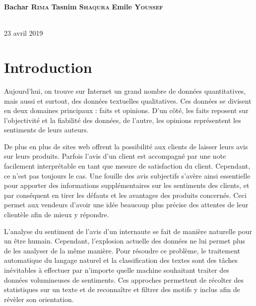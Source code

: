 \documentclass[12pt,a4paper]{report}
\theoremstyle{definition}
\begin{document}
\begin{titlepage}
\begin{minipage}{0.4\textwidth}
\centering \Large
\textbf{Bachar \textsc{Rima}} %
\textbf{Tasnim \textsc{Shaqura}} %
\textbf{Emile \textsc{Youssef}} %
\end{minipage} \\[0.8cm]

{\large 23 avril 2019}\\[1cm]
\hspace{\fill}
\vfill %
\end{titlepage}

\tableofcontents
\cleardoublepage

\setcounter{page}{1}
\chapter{Introduction}
Aujourd'hui, on trouve sur Internet un grand nombre de données quantitatives, mais aussi et surtout, des données textuelles qualitatives. Ces données se divisent en deux domaines principaux : faits et opinions. D'un côté, les faits reposent sur l'objectivité et la fiabilité des données, de l'autre, les opinions représentent les sentiments de leurs auteurs.

De plus en plus de sites web offrent la possibilité aux clients de laisser leurs avis sur leurs produits. Parfois l'avis d'un client est  accompagné par une note facilement interprétable en tant que mesure de satisfaction du client. Cependant, ce n'est pas toujours le cas. Une fouille des avis subjectifs s'avère ainsi essentielle pour apporter des informations supplémentaires sur les sentiments des clients, et par conséquent en tirer les défauts et les avantages des produits concernés. Ceci permet aux vendeurs d'avoir une idée beaucoup plus précise des attentes de leur clientèle afin de mieux y répondre.

L'analyse du sentiment de l'avis d'un internaute se fait de manière naturelle pour un être humain. Cependant, l'explosion actuelle des données ne lui permet plus de les analyser de la même manière. Pour résoudre ce problème, le traitement automatique du langage naturel et la classification des textes sont des tâches inévitables à effectuer par n'importe quelle machine souhaitant traiter des données volumineuses de sentiments. Ces approches permettent de récolter des statistiques sur un texte et de reconnaître et filtrer des motifs y inclus afin de révèler son orientation.
\end{document}
